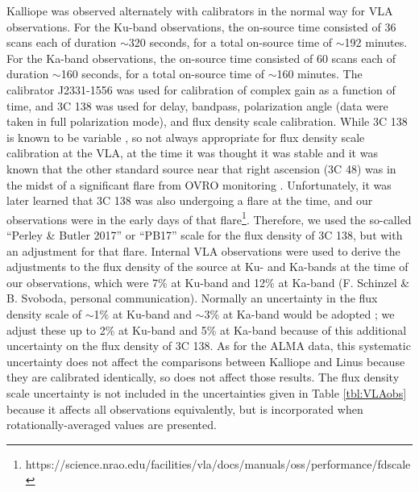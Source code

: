 \documentclass[]{aastex631}
\begin{document}
Kalliope was observed alternately with calibrators in the normal way for VLA observations.  For the Ku-band observations, the on-source time consisted of 36 scans each of duration $\sim$320 seconds, for a total on-source time of $\sim$192 minutes.  For the Ka-band observations, the on-source time consisted of 60 scans each of duration $\sim$160 seconds, for a total on-source time of $\sim$160 minutes.  The calibrator J2331-1556 was used for calibration of complex gain as a function of time, and 3C 138 was used for delay, bandpass, polarization angle (data were taken in full polarization mode), and flux density scale calibration.  While 3C 138 is known to be variable \citep{perley2013,perley2017}, so not always appropriate for flux density scale calibration at the VLA, at the time it was thought it was stable and it was known that the other standard source near that right ascension (3C 48) was in the midst of a significant flare from OVRO monitoring \citep{richards2011}.  Unfortunately, it was later learned that 3C 138 was also undergoing a flare at the time, and our observations were in the early days of that flare\footnote{https://science.nrao.edu/facilities/vla/docs/manuals/oss/performance/fdscale}.  Therefore, we used the so-called ``Perley \& Butler 2017'' or ``PB17'' scale \citep{perley2017} for the flux density of 3C 138, but with an adjustment for that flare.  Internal VLA observations were used to derive the adjustments to the flux density of the source at Ku- and Ka-bands at the time of our observations, which were 7\% at Ku-band and 12\% at Ka-band (F. Schinzel \& B. Svoboda, personal communication).  Normally an uncertainty in the flux density scale of $\sim$1\% at Ku-band and $\sim$3\% at Ka-band would be adopted \citep{perley2013}; we adjust these up to 2\% at Ku-band and 5\% at Ka-band because of this additional uncertainty on the flux density of 3C 138.  As for the ALMA data, this systematic uncertainty does not affect the comparisons between Kalliope and Linus because they are calibrated identically, so does not affect those results. The flux density scale uncertainty is not included in the uncertainties given in Table \ref{tbl:VLAobs} because it affects all observations equivalently, but is incorporated when rotationally-averaged values are presented.
\end{document}
